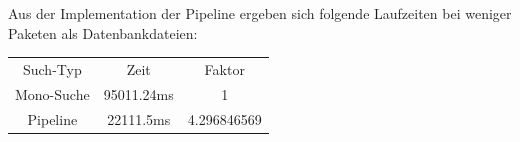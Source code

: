     Aus der Implementation der Pipeline ergeben sich folgende Laufzeiten bei weniger Paketen als Datenbankdateien:
    \begin{tabular}{|c|c|c|}
        \hline
            Such-Typ & Zeit & Faktor \\
            Mono-Suche & 95011.24ms & 1 \\
            Pipeline & 22111.5ms & 4.296846569 \\
        \hline
    \end{tabular}
